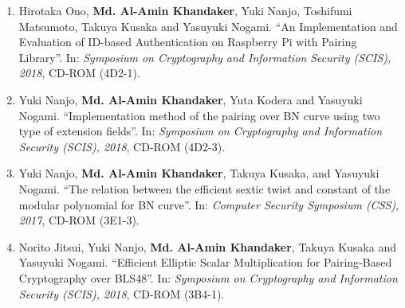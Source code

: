 \begin{enumerate}
	\item  Hirotaka Ono, \textbf{Md. Al-Amin Khandaker}, Yuki Nanjo, Toshifumi Matsumoto, Takuya Kusaka and Yasuyuki Nogami. ``An Implementation and Evaluation of ID-based Authentication on Raspberry Pi with Pairing Library''. In: \textit{Symposium on Cryptography and Information Security (SCIS),  2018}, CD-ROM (4D2-1).  
	
	\item Yuki Nanjo, \textbf{Md. Al-Amin Khandaker}, Yuta Kodera and Yasuyuki Nogami. ``Implementation method of the pairing over BN curve using two type of extension fields''. In: \textit{Symposium on Cryptography and Information Security (SCIS),  2018}, CD-ROM (4D2-3).
	
	\item Yuki Nanjo,  \textbf{Md. Al-Amin Khandaker}, Takuya Kusaka, and  Yasuyuki Nogami. ``The relation between the efficient sextic twist and constant of the modular polynomial for BN curve''. In: \textit{Computer Security Symposium  (CSS),  2017}, CD-ROM (3E1-3). 
	
	\item  Norito Jitsui, Yuki Nanjo, \textbf{Md. Al-Amin Khandaker}, Takuya Kusaka and Yasuyuki Nogami. ``Efficient Elliptic Scalar Multiplication for Pairing-Based Cryptography over BLS48''. In:  \textit{Symposium on Cryptography and Information Security (SCIS),  2018}, CD-ROM (3B4-1).
\end{enumerate}
\normalsize



